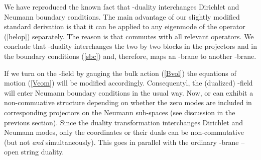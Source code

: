 \documentclass[a4paper,12pt,twoside]{article}
\begin{document}
We have reproduced the known fact that \coordHE{}-duality interchanges
Dirichlet and Neumann boundary conditions. The main advantage
of our slightly modified standard derivation is that it can be
applied to any eigenmode of the operator \coordHE{} (\ref{helop})
separately. The reason is that \coordHE{} commutes with all relevant
operators. We conclude that \coordHE{}-duality interchanges the two by two
blocks in the projectors
\myHighlight{$(\Pi )_{\alpha\beta}$}\coordHE{} and \coordHE{}
in the boundary conditions (\ref{sbc}) and, therefore, maps
an \coordHE{}-brane to another \coordHE{}-brane. 

If we turn on the \coordHE{}-field by gauging the bulk action
(\ref{Bvol}) the equations of motion (\ref{Veom}) will
be modified accordingly. Consequentyl, the (dualized)
\coordHE{}-field will enter Neumann boundary conditions in the
usual way. Now, \coordHE{} or \coordHE{} can exhibit a
non-commuative structure depending on whether the zero
modes are included in corresponding projectors on the
Neumann sub-spaces (see discussion in the previous section).
Since the duality transformation interchanges Dirichlet and
Neumann modes, only the coordinates \coordHE{} or their
duals \coordHE{} can be non-commutative (but not \coordHE{}
{\it and} \coordHE{} simultaneously). This goes in parallel
with the ordinary \coordHE{}-brane -- open string duality.
\end{document}
